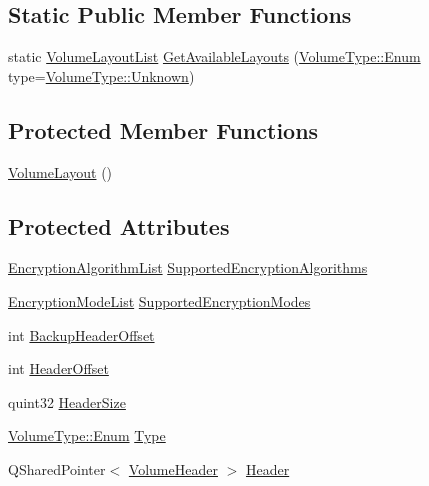 \subsection*{Static Public Member Functions}
\begin{DoxyCompactItemize}
\item 
static \hyperlink{namespace_gost_crypt_1_1_volume_a5b9119eca7c78317a24ab85145fb9ac8}{Volume\+Layout\+List} \hyperlink{class_gost_crypt_1_1_volume_1_1_volume_layout_a75afc853a72f97ec34cc9c6f056cd548}{Get\+Available\+Layouts} (\hyperlink{struct_gost_crypt_1_1_volume_1_1_volume_type_a7fe1979dab76d4534dcb1e26179d4717}{Volume\+Type\+::\+Enum} type=\hyperlink{struct_gost_crypt_1_1_volume_1_1_volume_type_a7fe1979dab76d4534dcb1e26179d4717a00b5befddf2b1362a5a66b3a6567ff20}{Volume\+Type\+::\+Unknown})
\end{DoxyCompactItemize}
\subsection*{Protected Member Functions}
\begin{DoxyCompactItemize}
\item 
\hyperlink{class_gost_crypt_1_1_volume_1_1_volume_layout_a80bcdd093911d6da1e3d145fe4d17028}{Volume\+Layout} ()
\end{DoxyCompactItemize}
\subsection*{Protected Attributes}
\begin{DoxyCompactItemize}
\item 
\hyperlink{namespace_gost_crypt_1_1_volume_ae58c307b345c639d35f6dc68af4017b5}{Encryption\+Algorithm\+List} \hyperlink{class_gost_crypt_1_1_volume_1_1_volume_layout_a314519a204b3572ed727071d7939e751}{Supported\+Encryption\+Algorithms}
\item 
\hyperlink{namespace_gost_crypt_1_1_volume_a94b281aaee6b2ca9317cf8bf25605f79}{Encryption\+Mode\+List} \hyperlink{class_gost_crypt_1_1_volume_1_1_volume_layout_a2dcde837e6e78dda547ba17309645297}{Supported\+Encryption\+Modes}
\item 
int \hyperlink{class_gost_crypt_1_1_volume_1_1_volume_layout_a298446dedd1daaca3ce06bbe7edfdd03}{Backup\+Header\+Offset}
\item 
int \hyperlink{class_gost_crypt_1_1_volume_1_1_volume_layout_ad44f93b295dea671c869cb8adf99eda7}{Header\+Offset}
\item 
quint32 \hyperlink{class_gost_crypt_1_1_volume_1_1_volume_layout_a34ad731ec5a80e2bc23c435416bac270}{Header\+Size}
\item 
\hyperlink{struct_gost_crypt_1_1_volume_1_1_volume_type_a7fe1979dab76d4534dcb1e26179d4717}{Volume\+Type\+::\+Enum} \hyperlink{class_gost_crypt_1_1_volume_1_1_volume_layout_a2746f54b98f99c2f3fec77ef73d24699}{Type}
\item 
Q\+Shared\+Pointer$<$ \hyperlink{class_gost_crypt_1_1_volume_1_1_volume_header}{Volume\+Header} $>$ \hyperlink{class_gost_crypt_1_1_volume_1_1_volume_layout_aae2968088775231e6f37ce2bfbd6d534}{Header}
\end{DoxyCompactItemize}


